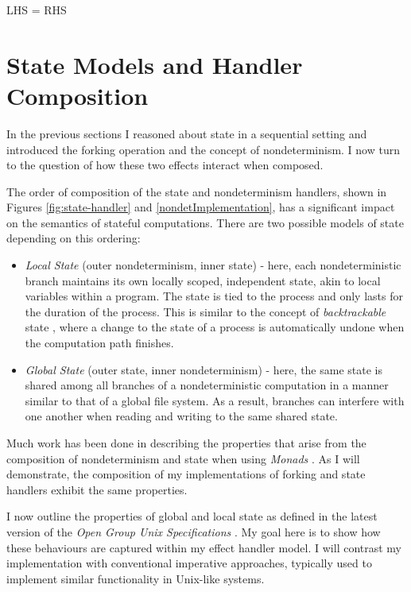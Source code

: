 \documentclass[logo,bsc,singlespacing,parskip]{infthesis}
\begin{document}
LHS = RHS





\section{State Models and Handler Composition}
In the previous sections I reasoned about state in a  sequential setting and introduced the forking operation and the concept of nondeterminism. I now turn to the question of how these two effects interact when composed. 

The order of composition of the state  and nondeterminism handlers, shown in Figures \ref{fig:state-handler} and \ref{nondetImplementation}, has a significant impact on the semantics of stateful computations. There are two possible models of state  depending on this ordering: 
\begin{itemize}
    \item \textit{Local State} (outer nondeterminism, inner state) - here, each nondeterministic branch maintains its own locally scoped, independent state, akin to local variables within a program.  The state is tied to the process and only lasts for the duration of the process. This is similar to the concept of \textit{backtrackable} state \cite{pauwels2019handling}, where a change to the state of a process is automatically undone when the computation path finishes. 
    \item \textit{Global State} (outer state, inner nondeterminism) - here, the same state is shared among all branches of a nondeterministic computation in a manner similar to that  of a global file system. As a result, branches can interfere with one another when reading and writing to the same shared state.
\end{itemize}

Much work has been done in describing the properties that arise from the composition of nondeterminism and state when using \textit{Monads} \cite{tang2025high}. As I will demonstrate, the composition of my implementations of forking and state handlers exhibit the same properties. 

I now outline the properties of global and local state as defined in the latest version of the \textit{Open Group Unix Specifications} \cite{posix}. My goal here is to show how these behaviours are captured within my effect handler model. I will contrast my implementation with conventional imperative approaches, typically used to implement similar functionality in Unix-like systems. 
\end{document}
